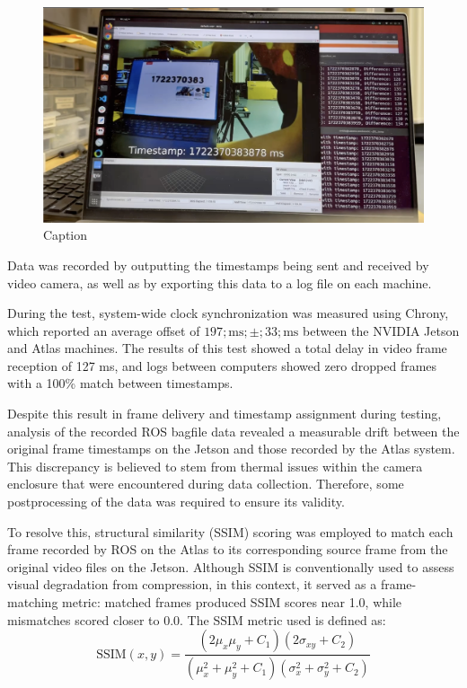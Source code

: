 \documentclass{erauthesis}
\begin{document}
\begin{figure}[htbp]
    \centering
    \includegraphics[width=0.8\linewidth]{Images/time_sync1.png}
    \caption{Caption}
    \label{fig:time_sync1}
\end{figure}


Data was recorded by outputting the timestamps being sent and received by video camera, as well as by exporting this data to a log file on each machine. 

During the test, system-wide clock synchronization was measured using Chrony, which reported an average offset of $197;\text{ms};\pm;33;\text{ms}$ between the NVIDIA Jetson and Atlas machines.
The results of this test showed a total delay in video frame reception of 127 ms, and logs between computers showed zero dropped frames with a 100\% match between timestamps.

Despite this result in frame delivery and timestamp assignment during testing, analysis of the recorded ROS bagfile data revealed a measurable drift between the original frame timestamps on the Jetson and those recorded by the Atlas system. 
This discrepancy is believed to stem from thermal issues within the camera enclosure that were encountered during data collection.
Therefore, some postprocessing of the data was required to ensure its validity.

To resolve this, structural similarity (SSIM) scoring was employed to match each frame recorded by ROS on the Atlas to its corresponding source frame from the original video files on the Jetson. Although SSIM is conventionally used to assess visual degradation from compression, in this context, it served as a frame-matching metric: matched frames produced SSIM scores near 1.0, while mismatches scored closer to 0.0. The SSIM metric used is defined as:
\begin{equation}
    \text{SSIM}(x, y) = \frac{(2\mu_x\mu_y + C_1)(2\sigma_{xy} + C_2)}{(\mu_x^2 + \mu_y^2 + C_1)(\sigma_x^2 + \sigma_y^2 + C_2)}
\end{equation}
\end{document}
